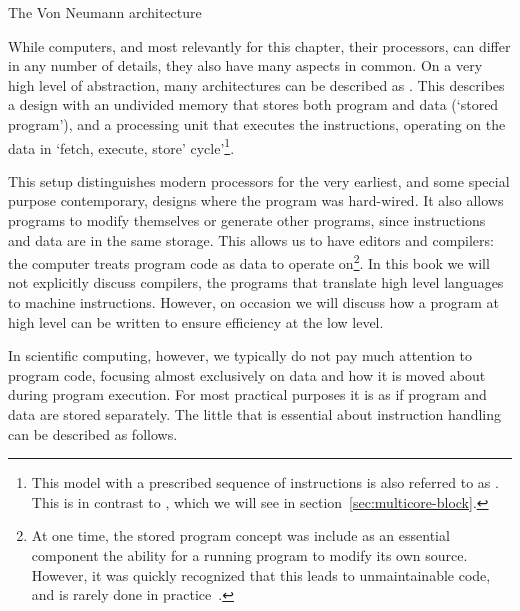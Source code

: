  {The Von Neumann architecture}
\label{sec:vonneuman}

While computers, and most relevantly for this chapter, their
processors, can differ in any number of details, they also have many
aspects in common. On a very high level of abstraction, many
architectures can be described as .
This describes a design with an undivided memory
that stores both program and data (`stored program'), and a processing
unit that executes the instructions, operating on the data in `fetch,
execute, store' cycle'\footnote{This model with a prescribed sequence
  of instructions is also referred to as .
  This is in contrast to , which we will
  see in section~\ref{sec:multicore-block}.}.

This setup distinguishes modern processors for the very earliest, and
some special purpose contemporary, designs where the program was
hard-wired. It also allows programs to modify themselves or generate
other programs, since instructions and data are in the same
storage. This allows us to have editors and compilers: the computer
treats program code as data to operate on\footnote{At one time, the
  stored program concept was include as an essential component the
  ability for a running program to modify its own source. However, it
  was quickly recognized that this leads to unmaintainable code, and
  is rarely done in practice~\cite{EWD:EWD117}.}. In this book we will
not explicitly discuss compilers, the programs that translate high
level languages to machine instructions. However, on occasion we will
discuss how a program at high level can be written to ensure
efficiency at the low level.

In scientific computing, however, we typically do not pay much
attention to program code, focusing almost exclusively on data and how
it is moved about during program execution.  For most practical
purposes it is as if program and data are stored separately. The
little that is essential about instruction handling can be described
as follows.

